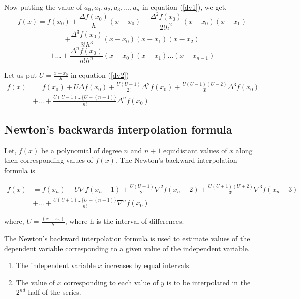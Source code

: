 \documentclass[11pt, a4paper]{article}
\begin{document}
Now putting the value of $a_0,a_1,a_2,a_3,\dots,a_n$ in equation (\ref{dv1}), we get,
\begin{equation*}\label{dv2}
  f(x)=f(x_0)+\frac{\Delta f(x_0)}{h}(x-x_0)+\frac{\Delta^2f(x_0)}{2!h^2}(x-x_0)(x-x_1)
\end{equation*}
\begin{equation*}\label{dv2}
      +\frac{\Delta^3f(x_0)}{3!h^3}(x-x_0)(x-x_1)(x-x_2)
\end{equation*}
\begin{equation}\label{dv2}
      +\dots+\frac{\Delta^nf(x_0)}{n!h^n}(x-x_0)(x-x_1)\dots(x-x_{n-1})
\end{equation}

Let us put $U=\frac{x-x_0}{h}$ in equation (\ref{dv2})
\begin{align*}
  f(x)&=f(x_0)+U\Delta f(x_0)+\frac{U(U-1)}{2!}\Delta^2f(x_0)+\frac{U(U-1)(U-2)}{3!}\Delta^3f(x_0)\\
  &+\dots+\frac{U(U-1)\dots\{U-(n-1)\}}{n!}\Delta^nf(x_0)
\end{align*}

\subsection{Newton's backwards interpolation formula}
Let, $f(x)$ be a polynomial  of degree $n$ and $n+1$ equidistant values of $x$
along then
corresponding values of $f(x)$. The Newton's backward interpolation formula is

\begin{align*}
  f(x) &= f(x_n)+U\nabla f(x_n-1)+\frac{U(U+1)}{2!}\nabla^2f(x_n-2)+\frac{U(U+1)(U+2)}{3!}\nabla^3f(x_n-3)\\
       &+\dots+\frac{U(U+1)\dots\{U+(n-1)\}}{n!}\nabla^nf(x_0)
\end{align*}

where, $U=\frac{(x-x_n)}{h}$, where h is the interval of differences.

The Newton's backward interpolation formula is used to estimate values of the
dependent 
variable corresponding to a given value of the independent variable.

\begin{enumerate}
  \item The independent variable $x$ increases by equal intervals.
  \item The value of $x$ corresponding to each value of $y$ is to be
    interpolated in the $2^{nd}$ half of the series.
\end{enumerate}
\end{document}

